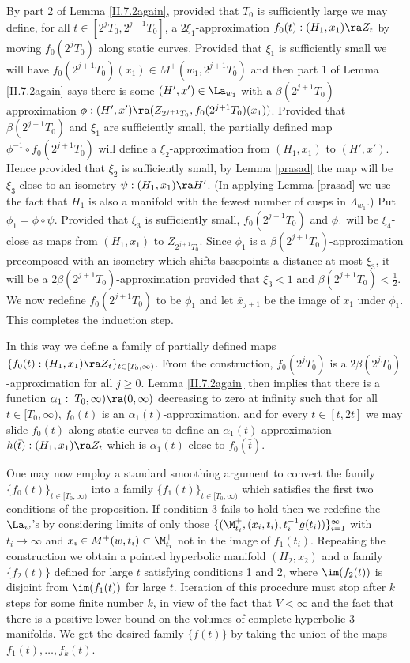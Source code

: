 By part 2 of Lemma \ref{II.7.2again}, provided that $T_0$ is
sufficiently large we may define, for all $t\in [2^j T_0, 2^{j+1} T_0]$,
a  $2\xi_1$-approximation $f_0(t):(H_1,x_1)\ra Z_t$ by
moving $f_0(2^j T_0)$ along static curves.  Provided that
$\xi_1$ is sufficiently small we will have
$f_0(2^{j+1} T_0)(x_1)\in M^+(w_1,2^{j+1} T_0)$ and then part 1 of
Lemma \ref{II.7.2again} says there is some $(H',x')\in \La_{w_1}$
with a $\beta(2^{j+1} T_0)$-approximation
$\phi:(H',x')\ra (Z_{2^{j+1} T_0},f_0(2^{j+1} T_0)(x_1))$.
Provided that
$\beta(2^{j+1} T_0)$
and $\xi_1$ are sufficiently small, the partially defined map
$\phi^{-1}\circ f_0(2^{j+1} T_0)$ will define a $\xi_2$-approximation
from $(H_1,x_1)$ to $(H',x')$. Hence provided that $\xi_2$
is sufficiently small, by Lemma \ref{prasad}
the map will be $\xi_3$-close to an isometry
$\psi:(H_1,x_1)\ra H'$.
(In applying Lemma \ref{prasad} we use the fact that $H_1$ is
also a manifold with the fewest number of cusps in $\Lambda_{w_1}$.)
 Put $\phi_1= \phi\circ\psi$.
Provided that $\xi_3$ is sufficiently small,
$f_0(2^{j+1} T_0)$ and $\phi_1$ will be $\xi_4$-close as maps from
$(H_1,x_1)$ to $Z_{2^{j+1} T_0}$.
Since $\phi_1$ is a $\beta(2^{j+1} T_0)$-approximation
precomposed with an isometry which shifts basepoints a
distance at most $\xi_3$, it will be a $2\beta(2^{j+1} T_0)$-approximation
provided that $\xi_3<1$ and $\beta(2^{j+1} T_0)<\frac12$.  We now redefine
$f_0(2^{j+1} T_0)$ to be $\phi_1$ and let $\overline{x}_{j+1}$ be the
image of $x_1$ under $\phi_1$. This completes the induction step.

In this way we define a family of partially defined maps
$\{f_0(t):(H_1,x_1)\ra Z_t\}_{t\in [T_0,\infty)}$.
From the construction,
$f_0(2^jT_0)$ is a $2\beta(2^jT_0)$-approximation
for all $j\geq 0$.   Lemma \ref{II.7.2again} then implies
that there is a  function
$\alpha_1:[T_0,\infty)\ra(0,\infty)$ decreasing to
zero at infinity such that for all $t\in[T_0,\infty)$,
$f_0(t)$ is an $\alpha_1(t)$-approximation, and for every
$\bar t\in [t,2t]$ we may slide
$f_0(t)$
along
static curves to define an $\alpha_1(t)$-approximation
 $h(\bar t):(H_1,x_1)\ra Z_t$ which is $\alpha_1(t)$-close
to
$f_0(\bar t)$.

One may now employ a standard smoothing argument to convert the
family $\{f_0(t)\}_{t\in[T_0,\infty)}$ into  a family
$\{f_1(t)\}_{t\in [T_0,\infty)}$ which satisfies the first two
conditions of the proposition.   If condition 3 fails to hold then
we redefine the $\La_{w}$'s by considering  limits of only those
$\{(\M^+_{t_i}, (x_i, t_i), t_i^{-1} g(t_i))\}_{i=1}^\infty$
with $t_i \rightarrow \infty$ and
$x_i \in M^+(w,t_i)\subset \M_{t_i}^+$
not in
the image of $f_1(t_i)$.  Repeating the construction we
obtain a pointed hyperbolic manifold $(H_2,x_2)$ and a
family $\{f_2(t)\}$ defined for large $t$ satisfying conditions
1 and 2, where $\im(f_2(t))$ is disjoint from $\im(f_1(t))$ for large
$t$.  Iteration of this procedure must stop after  $k$
steps for some finite number $k$, in view of the fact that $\overline{V} < \infty$ and
the fact that there is a positive lower bound on the volumes of
complete hyperbolic $3$-manifolds. We get the
desired family $\{f(t)\}$ by taking the union of the maps
$f_1(t),\ldots,f_k(t)$.


